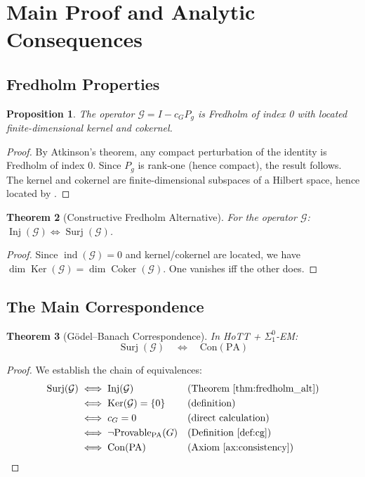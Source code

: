 \documentclass[11pt]{article}
\newtheorem{theorem}{Theorem}[section]
\newtheorem{proposition}[theorem]{Proposition}
\theoremstyle{definition}
\newcommand{\SigOne}{\Sigma^{0}_{\!1}}
\newcommand{\PA}{\mathrm{PA}}
\newcommand{\Con}{\mathrm{Con}}
\DeclareMathOperator{\Ker}{Ker}
\DeclareMathOperator{\Coker}{Coker}
\DeclareMathOperator{\Surj}{Surj}
\DeclareMathOperator{\Inj}{Inj}
\DeclareMathOperator{\ind}{ind}
\begin{document}
\section{Main Proof and Analytic Consequences}

\subsection{Fredholm Properties}

\begin{proposition}\label{prop:fredholm}
The operator $\mathcal{G} = I - c_G P_g$ is Fredholm of index 0 with located finite-dimensional kernel and cokernel.
\end{proposition}

\begin{proof}
By Atkinson's theorem, any compact perturbation of the identity is Fredholm of index 0. Since $P_g$ is rank-one (hence compact), the result follows. The kernel and cokernel are finite-dimensional subspaces of a Hilbert space, hence located by \cite{BR87}.
\end{proof}

\begin{theorem}[Constructive Fredholm Alternative]\label{thm:fredholm_alt}
For the operator $\mathcal{G}$: $\Inj(\mathcal{G}) \iff \Surj(\mathcal{G})$.
\end{theorem}

\begin{proof}
Since $\ind(\mathcal{G}) = 0$ and kernel/cokernel are located, we have $\dim\Ker(\mathcal{G}) = \dim\Coker(\mathcal{G})$. One vanishes iff the other does.
\end{proof}

\subsection{The Main Correspondence}

\begin{theorem}[Gödel--Banach Correspondence]\label{thm:GBC}
In HoTT + $\SigOne$-EM:
\[
\Surj(\mathcal{G}) \quad\Longleftrightarrow\quad \Con(\PA)
\]
\end{theorem}

\begin{proof}
We establish the chain of equivalences:
\begin{align}
\Surj(\mathcal{G}) &\iff \Inj(\mathcal{G}) &&\text{(Theorem \ref{thm:fredholm_alt})} \\
&\iff \Ker(\mathcal{G})=\{0\} &&\text{(definition)} \\
&\iff c_G=0 &&\text{(direct calculation)} \\
&\iff \neg\text{Provable}_{\PA}(G) &&\text{(Definition \ref{def:cg})} \\
&\iff \Con(\PA) &&\text{(Axiom \ref{ax:consistency})}
\end{align}
\end{proof}
\end{document}
